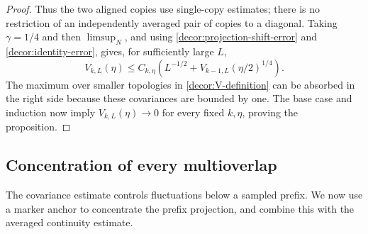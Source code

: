 \begin{proof}
Thus the two aligned copies use single-copy estimates; there is no
restriction of an independently averaged pair of copies to a diagonal.
Taking $\gamma=1/4$ and then $\limsup_N$, and using
\eqref{decor:projection-shift-error} and
\eqref{decor:identity-error}, gives, for sufficiently large $L$,
\begin{equation}
 V_{k,L}(\eta)\le C_{k,\eta}\left(
       L^{-1/2}+V_{k-1,L}(\eta/2)^{1/4}\right).
 \label{decor:induction-recursion}
\end{equation}
The maximum over smaller topologies in \eqref{decor:V-definition}
can be absorbed in the right side because these covariances are
bounded by one.  The base case and induction now imply
$V_{k,L}(\eta)\to0$ for every fixed $k,\eta$, proving the proposition.
\end{proof}

\subsection{Concentration of every multioverlap}

The covariance estimate controls fluctuations below a sampled prefix.
We now use a marker anchor to concentrate the prefix projection, and
combine this with the averaged continuity estimate.

